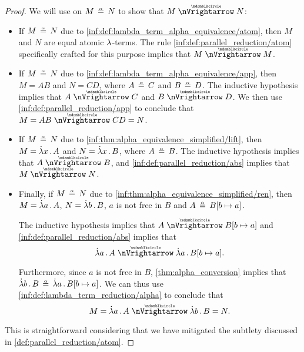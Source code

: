 \begin{proof}
   We will use  on \( M \aequiv N \) to show that \( M \ppred N \):
  \begin{itemize}
    \item If \( M \aequiv N \) due to \ref{inf:def:lambda_term_alpha_equivalence/atom}, then \( M \) and \( N \) are equal atomic \( {\mathrm \lambda} \)-terms. The rule \ref{inf:def:parallel_reduction/atom} specifically crafted for this purpose implies that \( M \ppred M \).

    \item If \( M \aequiv N \) due to \ref{inf:def:lambda_term_alpha_equivalence/app}, then \( M = AB \) and \( N = CD \), where \( A \aequiv C \) and \( B \aequiv D \). The inductive hypothesis implies that \( A \ppred C \) and \( B \ppred D \). We then use \ref{inf:def:parallel_reduction/app} to conclude that \( M = AB \ppred CD = N \).

    \item If \( M \aequiv N \) due to \ref{inf:thm:alpha_equivalence_simplified/lift}, then \( M = \qabs x A \) and \( N = \qabs x B \), where \( A \aequiv B \). The inductive hypothesis implies that \( A \ppred B \), and \ref{inf:def:parallel_reduction/abs} implies that \( M \ppred N \).

    \item Finally, if \( M \aequiv N \) due to \ref{inf:thm:alpha_equivalence_simplified/ren}, then \( M = \qabs a A \), \( N = \qabs b B \), \( a \) is not free in \( B \) and \( A \aequiv B[b \mapsto a] \).

    The inductive hypothesis implies that \( A \ppred B[b \mapsto a] \) and \ref{inf:def:parallel_reduction/abs} implies that
    \begin{equation*}
      \qabs a A \ppred \qabs a B[b \mapsto a].
    \end{equation*}

    Furthermore, since \( a \) is not free in \( B \), \cref{thm:alpha_conversion} implies that \( \qabs b B \aequiv \qabs a B[b \mapsto a] \). We can thus use \ref{inf:def:lambda_term_reduction/alpha} to conclude that
    \begin{equation*}
      M = \qabs a A \ppred \qabs b B = N.
    \end{equation*}
  \end{itemize}

   This is straightforward considering that we have mitigated the subtlety discussed in \cref{def:parallel_reduction/atom}.


\end{proof}
